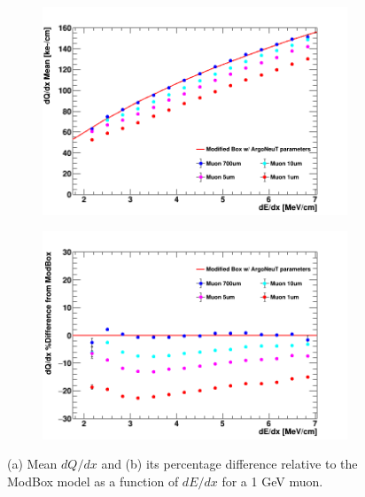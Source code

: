 \begin{figure}[t!]
        \begin{subfigure}[b]{0.495\textwidth}   
            \centering 
            \includegraphics[width=\textwidth]{mu_profile}
            \caption{}%
            \label{fig:mu_range_delta_magnitude}
        \end{subfigure}
        \hfill
        \begin{subfigure}[b]{0.495\textwidth}   
            \centering 
            \includegraphics[width=\textwidth]{mu_profile_diff}
            \caption{}%
            \label{fig:mu_range_delta_diff}
        \end{subfigure}
	\caption[Impacts of Delta Ray Fluctuations on Muons]{(a) Mean $dQ/dx$ and (b) its percentage difference relative to the ModBox model as a function of $dE/dx$ for a 1 GeV muon. }
        \label{fig:mu_range_delta}
\end{figure}

